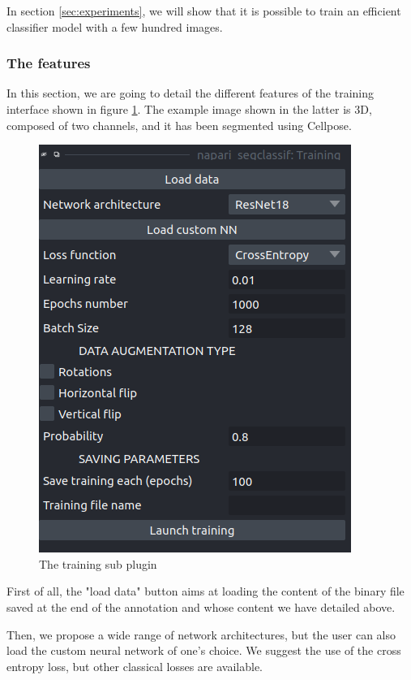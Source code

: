 \documentclass{article}
\begin{document}
In section \ref{sec:experiments}, we will show that it is possible to train an efficient classifier model with a few hundred images.

\subsubsection{The features}

In this section, we are going to detail the different features of the training interface shown in figure \ref{training}. The example image shown in the latter is 3D, composed of two channels, and it has been segmented using Cellpose\cite{stringer2021cellpose}.
\begin{figure}[htp!]{}
 \centering
 \includegraphics[scale=0.15]{Figures/training.png}
  \caption{The training sub plugin}
  \label{training}

\end{figure}


First of all, the "load data" button aims at loading the content of the binary file saved at the end of the annotation and whose content we have detailed above.

Then, we propose a wide range of network architectures, but the user can also load the custom neural network of one's choice. We suggest the use of the cross entropy loss, but other classical losses are available. 
\end{document}

